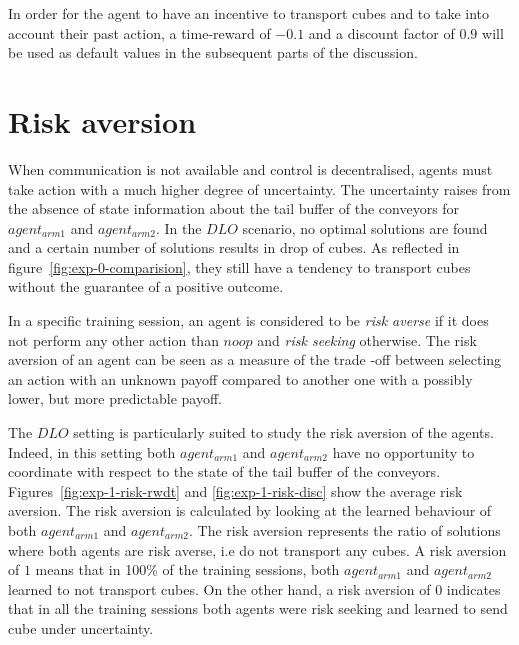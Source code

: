 In order for the agent to have an incentive to transport cubes and to take into account their past action, a time-reward of $-0.1$ and a discount factor of $0.9$ will be used as default values in the subsequent parts of the discussion. 

\section{Risk aversion}
\label{sec:risk-aversion}
When communication is not available and control is decentralised, agents must take action with a much higher degree of uncertainty. The uncertainty raises from the absence of state information about the tail buffer of the conveyors for $agent_{arm1}$ and $agent_{arm2}$.  In the $DLO$ scenario, no optimal solutions are found and a certain number of solutions results in drop of cubes. As reflected in figure~\ref{fig:exp-0-comparision}, they still have a tendency to transport cubes without the guarantee of a positive outcome. 

In a specific training session, an agent is considered to be \textit{risk averse} if it does not perform any other action than $noop$ and \textit{risk seeking} otherwise. The risk aversion of an agent can be seen as a measure of the trade -off between selecting an action with an unknown payoff compared to another one with a possibly lower, but more predictable payoff. 

The $DLO$ setting is particularly suited to study the risk aversion of the agents. Indeed, in this setting both $agent_{arm1}$ and $agent_{arm2}$ have no opportunity to coordinate with respect to the state of the tail buffer of the conveyors. Figures~\ref{fig:exp-1-risk-rwdt} and \ref{fig:exp-1-risk-disc} show the average risk aversion. The risk aversion is calculated by looking at the learned behaviour of both $agent_{arm1}$ and $agent_{arm2}$. The risk aversion represents the ratio of solutions where both agents are risk averse, i.e do not transport any cubes. A risk aversion of $1$ means that in 100\% of the training sessions, both  $agent_{arm1}$ and $agent_{arm2}$ learned to not transport cubes. On the other hand, a risk aversion of $0$ indicates that in all the training sessions both agents were risk seeking and learned to send cube under uncertainty.

